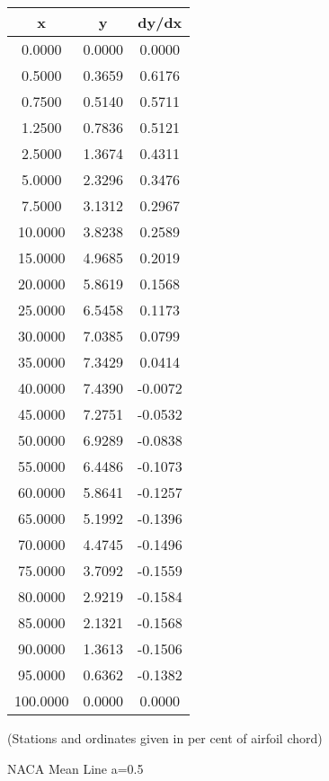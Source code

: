 \documentclass[11pt]{book}
\begin{document}
 \vspace{8mm}
 \begin{tabular}{|c|c|c|}  \hline
 x & y & dy/dx \\
 \hline
0.0000 & 0.0000 & 0.0000 \\
0.5000 & 0.3659 & 0.6176 \\
0.7500 & 0.5140 & 0.5711 \\
1.2500 & 0.7836 & 0.5121 \\
2.5000 & 1.3674 & 0.4311 \\
5.0000 & 2.3296 & 0.3476 \\
7.5000 & 3.1312 & 0.2967 \\
10.0000 & 3.8238 & 0.2589 \\
15.0000 & 4.9685 & 0.2019 \\
20.0000 & 5.8619 & 0.1568 \\
25.0000 & 6.5458 & 0.1173 \\
30.0000 & 7.0385 & 0.0799 \\
35.0000 & 7.3429 & 0.0414 \\
40.0000 & 7.4390 & -0.0072 \\
45.0000 & 7.2751 & -0.0532 \\
50.0000 & 6.9289 & -0.0838 \\
55.0000 & 6.4486 & -0.1073 \\
60.0000 & 5.8641 & -0.1257 \\
65.0000 & 5.1992 & -0.1396 \\
70.0000 & 4.4745 & -0.1496 \\
75.0000 & 3.7092 & -0.1559 \\
80.0000 & 2.9219 & -0.1584 \\
85.0000 & 2.1321 & -0.1568 \\
90.0000 & 1.3613 & -0.1506 \\
95.0000 & 0.6362 & -0.1382 \\
100.0000 & 0.0000 & 0.0000 \\
 \hline
 \end{tabular}
 \vspace{8mm}

(Stations and ordinates given in per cent of airfoil chord)

 \newpage
 \label{mla=0.5}
 \begin{Large}
 NACA Mean Line a=0.5
 \end{Large}
  
\end{document}
